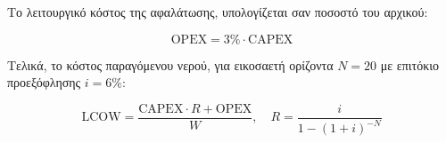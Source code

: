Το λειτουργικό κόστος της αφαλάτωσης, υπολογίζεται σαν ποσοστό του αρχικού:

\begin{equation}\label{eq:OPEX}
	\text{OPEX}=3\%\cdot \text{CAPEX}
\end{equation}

Τελικά, το κόστος παραγόμενου νερού, για εικοσαετή ορίζοντα \(Ν=20\) με
επιτόκιο προεξόφλησης \(i=6\%\):

\begin{equation}\label{eq:LCOW}
	\text{LCOW}= \frac{\text{CAPEX}\cdot R + \text{OPEX}}{W}, \quad R=\frac{i}{1-(1+i)^{-N}}
\end{equation}

